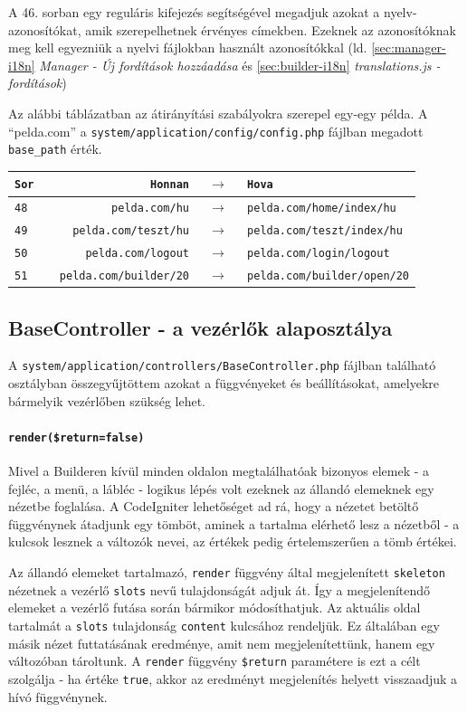 \documentclass[12pt,a4paper,twoside]{article}
\begin{document}
A 46. sorban egy reguláris kifejezés segítségével megadjuk azokat a
nyelv-azonosítókat, amik szerepelhetnek érvényes címekben. Ezeknek az
azonosítóknak meg kell egyezniük a nyelvi fájlokban használt azonosítókkal
(ld. \ref{sec:manager-i18n} \textit{Manager - Új fordítások hozzáadása} és
\ref{sec:builder-i18n} \textit{translations.js - fordítások})

Az alábbi táblázatban az átirányítási szabályokra szerepel egy-egy példa. A
``pelda.com'' a \texttt{system/application/config/config.php} fájlban megadott
\texttt{base\_path} érték.

\vspace{.4cm}
\begin{tabular*}{\textwidth}{>{\tt}l|>{\tt}r>{$\rightarrow$}c>{\tt}l}
  \rm Sor & \rm Honnan           & & \rm Hova        \\
  \hline
  48      & pelda.com/hu         & & pelda.com/home/index/hu  \\
  49      & pelda.com/teszt/hu   & & pelda.com/teszt/index/hu \\
  50      & pelda.com/logout     & & pelda.com/login/logout   \\
  51      & pelda.com/builder/20 & & pelda.com/builder/open/20
\end{tabular*}


\subsection{BaseController - a vezérlők alaposztálya}

A \texttt{system/application/controllers/BaseController.php} fájlban található
osztályban összegyűjtöttem azokat a függvényeket és beállításokat, amelyekre
bármelyik vezérlőben szükség lehet.

\paragraph{\texttt{render(\$return=false)}}
Mivel a Builderen kívül minden oldalon megtalálhatóak bizonyos
elemek - a fejléc, a menü, a lábléc - logikus lépés volt ezeknek az állandó
elemeknek egy nézetbe foglalása. A CodeIgniter lehetőséget ad rá, hogy a
nézetet betöltő függvénynek átadjunk egy tömböt, aminek a tartalma elérhető lesz
a nézetből - a kulcsok lesznek a változók nevei, az értékek pedig értelemszerűen
a tömb értékei.

Az állandó elemeket tartalmazó, \texttt{render} függvény által megjelenített
\texttt{skeleton} nézetnek a vezérlő \texttt{slots} nevű tulajdonságát adjuk
át. Így a megjelenítendő elemeket a vezérlő futása során bármikor
módosíthatjuk. Az aktuális oldal tartalmát a \texttt{slots} tulajdonság
\texttt{content} kulcsához rendeljük. Ez általában egy másik nézet futtatásának
eredménye, amit nem megjelenítettünk, hanem egy változóban tároltunk. A
\texttt{render} függvény \texttt{\$return} paramétere is ezt a célt szolgálja -
ha értéke \texttt{true}, akkor az eredményt megjelenítés helyett visszaadjuk a
hívó függvénynek.
\end{document}
